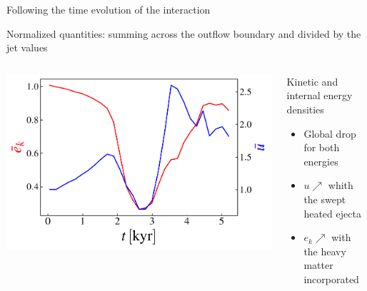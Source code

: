 
\begin{frame}{Following the time evolution of the interaction}
		
		{\scriptsize Normalized quantities: summing across the outflow boundary and divided by the jet values}
	\begin{columns}
	 \begin{column}{0.5\textwidth}
      \includegraphics[width=\linewidth]{images/evolution_integrated_xz_u_uk_2_riot.pdf}
     \end{column}
	 \begin{column}{0.5\textwidth}
		{\footnotesize
		\begin{block}{Kinetic and internal energy densities}
			\begin{itemize}
				\item Global drop for both energies
				\item $u \nearrow$ whith the swept heated ejecta 
				\item $e_k \nearrow$ with the heavy matter incorporated
			\end{itemize}
		\end{block}}
	\end{column}
	\end{columns}
	\begin{columns}

	   \begin{column}{.5\textwidth}


\end{column}
\end{columns}
\end{frame}
